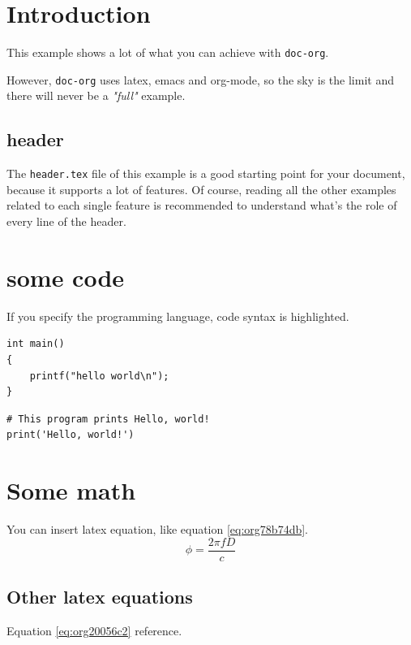 


\maketitle
\thispagestyle{empty}
\newpage

\tableofcontents
\newpage

\pagestyle{plain}

\section{Introduction}
\label{sec:org98855a7}
This example shows a lot of what you can achieve with \texttt{doc-org}.

However, \texttt{doc-org} uses latex, emacs and org-mode, so the sky is the limit and
there will never be a \emph{"full"} example.

\subsection{header}
\label{sec:orgdc79fd1}
The \texttt{header.tex} file of this example is a good starting point for your
document, because it supports a lot of features.
Of course, reading all the other examples related to each single feature is
recommended to understand what's the role of every line of the header.
\section{some code}
\label{sec:org9b73371}
If you specify the programming language, code syntax is highlighted.
\begin{verbatim}
int main()
{
    printf("hello world\n");
}
\end{verbatim}

\begin{verbatim}
# This program prints Hello, world!
print('Hello, world!')
\end{verbatim}

\section{Some math}
\label{sec:orga3573c5}
You can insert latex equation, like equation \ref{eq:org78b74db}.
\begin{equation}
\label{eq:org78b74db}
\phi = \frac{2\pi fD}{c}
\end{equation}
\subsection{Other latex equations}
\label{sec:orgb47becf}
Equation \ref{eq:org20056c2} reference.

